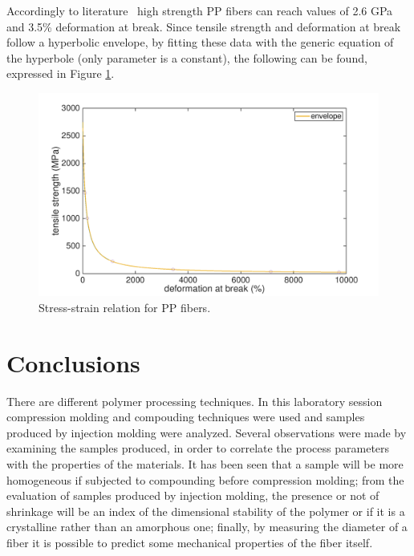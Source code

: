 \documentclass[a4paper, 11pt]{article}
\begin{document}
Accordingly to literature~\cite{handbook} high strength PP fibers can reach values of 2.6 GPa and 3.5\% deformation at break. Since tensile strength and deformation at break follow a hyperbolic envelope, by fitting these data with the generic equation of the hyperbole (only parameter is a constant), the following can be found, expressed in Figure \ref{fig:hyperbole}.
\begin{figure}[htp]
	\centering
	\includegraphics[scale=0.15]
	{hyperbole.png}
	\caption{Stress-strain relation for PP fibers.}
	\label{fig:hyperbole}
\end{figure}

\section{Conclusions}


There are different polymer processing techniques. In this laboratory session compression molding and compouding techniques were used and samples produced by injection molding were analyzed.
Several observations were made by examining the samples produced, in order to correlate the process parameters with the properties of the materials.
It has been seen that a sample will be more homogeneous if subjected to compounding before compression molding; from the evaluation of samples produced by injection molding, the presence or not of shrinkage will be an index of the dimensional stability of the polymer or if it is a crystalline rather than an amorphous one; finally, by measuring the diameter of a fiber it is possible to predict some mechanical properties of the fiber itself.
\newpage
\end{document}

